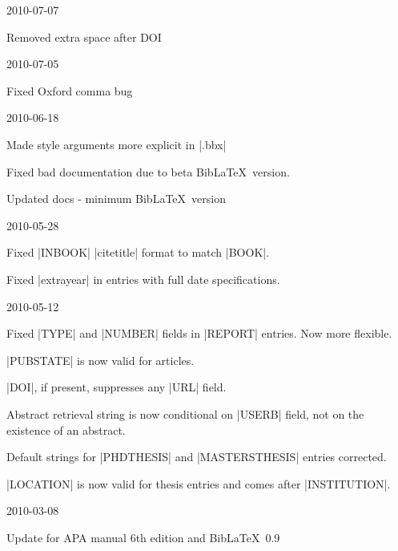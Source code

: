 \documentclass{ltxdockit}
\begin{document}
\begin{changelog}

\begin{release}{1.4}{2010-07-07}
\item Removed extra space after DOI
\end{release}

\begin{release}{1.3}{2010-07-05}
\item Fixed Oxford comma bug
\end{release}

\begin{release}{1.2}{2010-06-18}
\item Made style arguments more explicit in |.bbx|
\item Fixed bad documentation due to beta Bib\LaTeX\ version.
\item Updated docs - minimum Bib\LaTeX\ version
\end{release}

\begin{release}{1.1}{2010-05-28}
\item Fixed |INBOOK| |citetitle| format to match |BOOK|.
\item Fixed |extrayear| in entries with full date specifications.
\end{release}

\begin{release}{1.0}{2010-05-12}
\item Fixed |TYPE| and |NUMBER| fields in |REPORT| entries. Now more
  flexible.
\item |PUBSTATE| is now valid for articles.
\item |DOI|, if present, suppresses any |URL| field.
\item Abstract retrieval string is now conditional on |USERB| field, not on
  the existence of an abstract.
\item Default strings for |PHDTHESIS| and |MASTERSTHESIS| entries corrected.
\item |LOCATION| is now valid for thesis entries and comes after |INSTITUTION|.
\end{release}

\begin{release}{0.9}{2010-03-08}
\item Update for APA manual 6th edition and Bib\LaTeX\ 0.9
\end{release}


\end{changelog}
\end{document}
